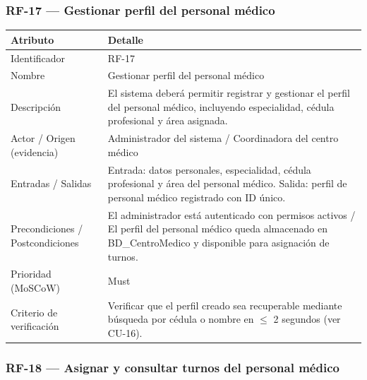 \documentclass[11pt,a4paper]{article}
\begin{document}
	\subsubsection{RF-17 --- Gestionar perfil del personal médico}
	
	\begin{longtable}{p{} p{}}
		
		\toprule
		\textbf{Atributo} & \textbf{Detalle} \\
		\midrule
		\endhead
		
		Identificador & RF-17 \\
		Nombre & Gestionar perfil del personal médico \\
		Descripción & El sistema deberá permitir registrar y gestionar el perfil del personal médico, incluyendo especialidad, cédula profesional y área asignada. \\
		Actor / Origen (evidencia) & Administrador del sistema / Coordinadora del centro médico \\
		Entradas / Salidas & Entrada: datos personales, especialidad, cédula profesional y área del personal médico. Salida: perfil de personal médico registrado con ID único. \\
		Precondiciones / Postcondiciones & El administrador está autenticado con permisos activos / El perfil del personal médico queda almacenado en BD\_CentroMedico y disponible para asignación de turnos. \\
		Prioridad (MoSCoW) & Must \\
		Criterio de verificación & Verificar que el perfil creado sea recuperable mediante búsqueda por cédula o nombre en \(\leq\) 2 segundos (ver CU-16). \\
		\bottomrule
	\end{longtable}
	
	\subsubsection{RF-18 --- Asignar y consultar turnos del personal médico}
	
\end{document}
